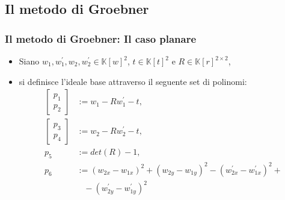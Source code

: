 \documentclass{beamer}
\begin{document}
\subsection{Il metodo di Groebner}


\begin{frame}
\frametitle{Il metodo di Groebner: Il caso planare}
\begin{itemize}
	\item Siano $w_1, w_1^{'}, w_2, w_2^{'} \in \mathbb{K}[w]^2$,  $t \in \mathbb{K}[t]^2$ e $R \in \mathbb{K}[r]^{2 \times 2}$,
	\item si definisce l'ideale base attraverso il seguente set di polinomi:
	\begin{align}
	\nonumber \begin{bmatrix}p_1 \\ p_2 \end{bmatrix} &:= w_1 - Rw_1^{'} - t,\\
	\nonumber \begin{bmatrix}p_3 \\ p_4 \end{bmatrix} &:= w_2 - Rw_2^{'} - t, \\
	\nonumber p_5 &:= det(R) - 1,\\
	\nonumber p_{6} &:= (w_{2x} - w_{1x})^2 + (w_{2y} - w_{1y})^2 - (w_{2x}^{'} - w_{1x}^{'})^2 + \\ \nonumber & \; \; \; - (w_{2y}^{'} - w_{1y}^{'})^2
	\end{align}
\end{itemize}
\end{frame}
\end{document}
